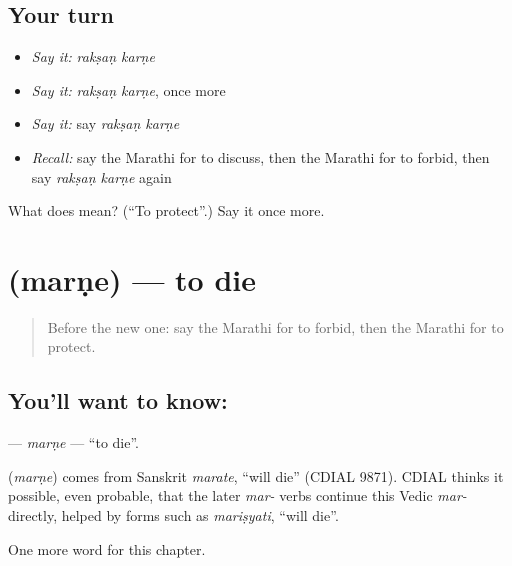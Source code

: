 \subsection*{Your turn}
\begin{itemize}
\raggedright
  \item \emph{Say it:} \emph{rakṣaṇ karṇe}
  \item \emph{Say it:} \emph{rakṣaṇ karṇe}, once more
  \item \emph{Say it:} say \emph{rakṣaṇ karṇe}
  \item \emph{Recall:} say the Marathi for to discuss, then the Marathi for to forbid, then say \emph{rakṣaṇ karṇe} again
\end{itemize}

\begin{tcolorbox}[breakable,colback=teal!4,colframe=teal!35!black,title={Before you move on}]
What does   mean? (\textquotedblleft{}To protect\textquotedblright{}.) Say it once more.
\end{tcolorbox}
\section[\texorpdfstring{\mr{मरणे} (marṇe)}{मरणे (marṇe)}]{ (marṇe) — to die}

\label{lesson:MR-C194-marne2}



\begin{quote}
Before the new one: say the Marathi for to forbid, then the Marathi for to protect.
\end{quote}

\subsection*{You'll want to know: }
\textbf{} — \emph{marṇe} — \textquotedblleft{}to die\textquotedblright{}.

\begin{cousinweb}
\textbf{} (\emph{marṇe}) comes from Sanskrit \emph{marate}, \textquotedblleft{}will die\textquotedblright{} (CDIAL 9871). CDIAL thinks it possible, even probable, that the later \emph{mar-} verbs continue this Vedic \emph{mar-} directly, helped by forms such as \emph{mariṣyati}, \textquotedblleft{}will die\textquotedblright{}.
\end{cousinweb}

\begin{grammarlens}[title={What you've built}]
One more word for this chapter.
\end{grammarlens}

